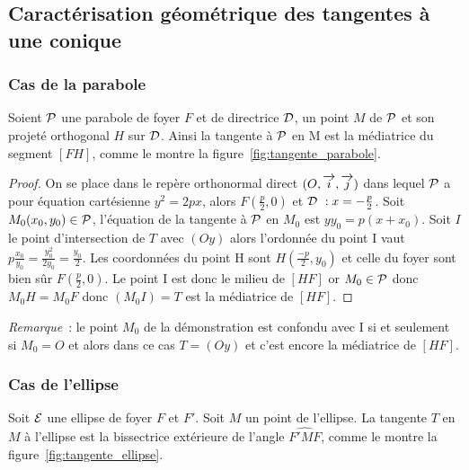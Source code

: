\subsection{Caractérisation géométrique des tangentes à une conique}

\subsubsection{Cas de la parabole}

\begin{prop}
  Soient \(\P\) une parabole de foyer \(F\) et de directrice \(\Dr\), un
  point \(M\) de \(\P\) et son projeté orthogonal \(H\) sur \(\Dr\).
  Ainsi la tangente à \(\P\) en M est la médiatrice du segment \([FH]\),
  comme le montre la figure~\ref{fig:tangente_parabole}.
\end{prop}

\begin{proof}
  On se place dans le repère orthonormal direct \(\rond\) dans lequel
  \(\P\) a pour équation cartésienne \(y^2 = 2px\), alors
  \(F\left(\frac{p}{2},0\right)\) et \(\Dr{}~: x = -\frac{p}{2}\). Soit
  \(M_0(x_0, y_0)\in\P\), l'équation de la tangente à \(\P\) en \(M_0\)
  est \(yy_0 = p(x + x_0)\). Soit \(I\) le point d'intersection de \(T\)
  avec \((Oy)\) alors l'ordonnée du point I vaut
  \(p\frac{x_0}{y_0} = \frac{y_0^2}{2y_0} = \frac{y_0}{2}\). Les coordonnées
  du point H sont \(H\left(\frac{-p}{2}, y_0\right)\) et celle du foyer
  sont bien sûr \(F\left(\frac{p}{2},0\right)\). Le point I est donc le
  milieu de \([HF]\) or \(M_0\in\P\) donc \(M_0H = M_0F\) donc
  \((M_0I) = T\) est la médiatrice de \([HF]\).
\end{proof}

\emph{Remarque}~: le point \(M_0\) de la démonstration est confondu avec
I si et seulement si \(M_0 = O\) et alors dans ce cas \(T = (Oy)\) et c'est
encore la médiatrice de \([HF]\).

\subsubsection{Cas de l'ellipse}

\begin{prop}
  Soit \(\Ell\) une ellipse de foyer \(F\) et \(F'\). Soit \(M\) un
  point de l'ellipse. La tangente \(T\) en \(M\) à l'ellipse est la
  bissectrice extérieure de l'angle \(\widehat{F'MF}\), comme le montre
  la figure~\ref{fig:tangente_ellipse}.
\end{prop}

